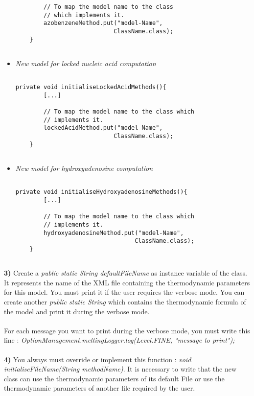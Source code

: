 \documentclass{article}
\begin{document}
\begin{itemize}
\begin{verbatim}
		// To map the model name to the class 
		// which implements it.
        azobenzeneMethod.put("model-Name", 
                            ClassName.class);
	}
	
\end{verbatim}

\item \textit{New model for locked nucleic acid computation}

\begin{verbatim}

private void initialiseLockedAcidMethods(){
		[...]
		
		// To map the model name to the class which 
		// implements it.
        lockedAcidMethod.put("model-Name", 
                            ClassName.class);
	}
	
\end{verbatim}

\item \textit{New model for hydroxyadenosine computation}

\begin{verbatim}

private void initialiseHydroxyadenosineMethods(){
		[...]
		
		// To map the model name to the class which 
		// implements it.
        hydroxyadenosineMethod.put("model-Name", 
                                  ClassName.class);
	}
	
\end{verbatim}
\end{itemize}


\textbf{3)} Create a \textit{public static String defaultFileName} as instance variable of the class. It represents
the name of the XML file containing the thermodynamic parameters for this model. You must print it if the
user requires the verbose mode. You can create another \textit{public static String} which contains the 
thermodynamic formula of the model and print it during the verbose mode.\\
\\
For each message you want to print during the verbose mode, you must write this line :
\textit{OptionManagement.meltingLogger.log(Level.FINE, "message to print");} \\
\\

\textbf{4)} You always must override or implement this function : \textit{void initialiseFileName(String methodName)}.
It is necessary to write that the new class can use the thermodynamic parameters of its default File or
use the thermodynamic parameters of another file required by the user.
\end{document}
